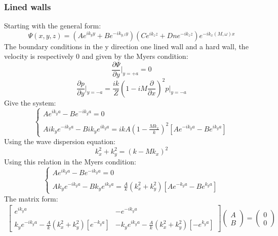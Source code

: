 \subsubsection*{Lined walls}\label{sec:EigenvalueLined}
Starting with the general form:
\begin{equation}
        \Psi(x,y,z)=(Ae^{ik_{y}y}+Be^{-ik_{y,l}y})(Ce^{ik_{z}z}+Dne^{-ik_{z}z})e^{-ik_{x}(M,\omega)x}
\end{equation}
The boundary conditions in the y direction one lined wall and a hard wall, the velocity is respectively 0 and given by the Myers condition:
\begin{equation}
    \frac{\partial\Psi}{\partial y} \Big|_{y=+a}=0
\end{equation}
\begin{equation}
    \frac{\partial p}{\partial y}\Bigg|_{y=-a}=\frac{ik}{Z}(1-iM\frac{\partial}{\partial x})^2 p\Bigg|_{y=-a}
\end{equation}
Give the system:
\begin{equation}\label{eq:2}
    \left\{
    \begin{array}{ll}
    Ae^{ik_ya}-Be^{-ik_ya}=0\\
        \\
    Aik_ye^{-ik_ya}-Bik_ye^{ik_ya}=ikA(1-\frac{Mk_x}{k})^2[Ae^{-ik_ya}-Be^{ik_ya}]
    \end{array}
    \right.
\end{equation}
Using the wave dispersion equation:
\begin{equation}
   k_x^2+k_y^2=(k-Mk_x)^2 
\end{equation}
Using this relation in the Myers condition:
\begin{equation}
    \left\{
    \begin{array}{ll}
    Ae^{ik_ya}-Be^{-ik_ya}=0\\
        \\
    Ak_ye^{-ik_ya}-Bk_ye^{ik_ya}=\frac{A}{k}(k_x^2+k_y^2)[Ae^{-k_ya}-Be^{k_ya}]
    \end{array}
    \right.
\end{equation}\label{eq:3}
The matrix form: 
 \begin{gather}
    \begin{bmatrix}
     e^{ik_ya} & -e^{-ik_ya} \\
      \\
     k_ye^{-ik_ya}-\frac{A}{k}(k_x^2+k_y^2)[e^{-k_ya}] & -k_ye^{ik_ya}-\frac{A}{k}(k_x^2+k_y^2)[-e^{k_ya}]
    \end{bmatrix}
    \begin{pmatrix}
       A\\
       B
    \end{pmatrix}
    =
    \begin{pmatrix}
      0\\
      0
    \end{pmatrix}
 \end{gather}
